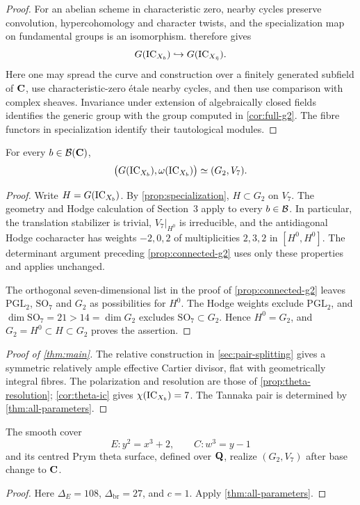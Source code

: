 \begin{proof}
For an abelian scheme in characteristic zero, nearby cycles preserve
convolution, hypercohomology and character twists, and the specialization
map on fundamental groups is an isomorphism.
\cite[Lemma~14.1 and Section~14]{KraemerWeissauer2015} therefore gives
\[
 G(\operatorname{IC}_{X_b})\hookrightarrow G(\operatorname{IC}_{X_{\bar\eta}}).
\]
Here one may spread the curve and construction over a finitely generated
subfield of $\mathbf C$, use characteristic-zero \'etale nearby cycles, and
then use comparison with complex sheaves.  Invariance under extension of
algebraically closed fields
\cite[Corollary~4.4]{JKLM2025} identifies the generic group with the
group computed in \cref{cor:full-g2}.  The fibre functors in specialization
identify their tautological modules.
\end{proof}

\begin{theorem}\label{thm:all-parameters}
For every $b\in\mathcal B(\mathbf C)$,
\[
 \bigl(G(\operatorname{IC}_{X_b}),\omega(\operatorname{IC}_{X_b})\bigr)\simeq(G_2,V_7).
\]
\end{theorem}
\begin{proof}
Write $H=G(\operatorname{IC}_{X_b})$.  By \cref{prop:specialization}, $H\subset G_2$
on $V_7$.  The geometry and Hodge calculation of Section~3 apply to
every $b\in\mathcal B$.  In particular, the translation stabilizer is trivial,
$V_7|_{H^0}$ is irreducible, and the antidiagonal Hodge cocharacter has
weights $-2,0,2$ of multiplicities $2,3,2$ in $[H^0,H^0]$.
The determinant argument preceding \cref{prop:connected-g2} uses only
these properties and applies unchanged.

The orthogonal seven-dimensional list in the proof of
\cref{prop:connected-g2} leaves $\mathrm{PGL}_2$, $\mathrm{SO}_7$ and
$G_2$ as possibilities for $H^0$.  The Hodge weights exclude
$\mathrm{PGL}_2$, and $\dim\mathrm{SO}_7=21>14=\dim G_2$ excludes
$\mathrm{SO}_7\subset G_2$.  Hence $H^0=G_2$, and
$G_2=H^0\subset H\subset G_2$ proves the assertion.
\end{proof}

\begin{proof}[Proof of \cref{thm:main}]
The relative construction in \cref{sec:pair-splitting} gives a symmetric
relatively ample effective Cartier divisor, flat with geometrically
integral fibres.  The polarization and resolution are those of
\cref{prop:theta-resolution}; \cref{cor:theta-ic} gives
$\chi(\operatorname{IC}_{X_b})=7$.  The Tannaka pair is determined by
\cref{thm:all-parameters}.
\end{proof}

\begin{corollary}
The smooth cover
\[
 E:y^2=x^3+2,\qquad C:w^3=y-1
\]
and its centred Prym theta surface, defined over $\mathbf Q$, realize
$(G_2,V_7)$ after base change to $\mathbf C$.
\end{corollary}
\begin{proof}
Here $\Delta_E=108$, $\Delta_{\mathrm{br}}=27$, and $c=1$.
Apply \cref{thm:all-parameters}.
\end{proof}

